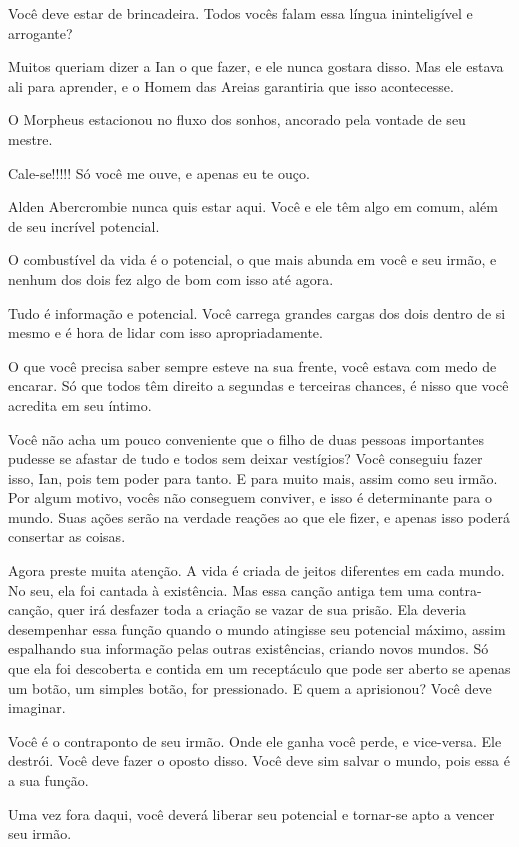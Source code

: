 Você deve estar de brincadeira. Todos vocês falam essa língua
ininteligível e arrogante?

{\large Muitos queriam dizer a Ian o que fazer, e ele nunca gostara
disso. Mas ele estava ali para aprender, e o Homem das Areias garantiria
que isso acontecesse.

O Morpheus estacionou no fluxo dos sonhos, ancorado pela vontade de seu
mestre.}

{\Large Cale-se!!!!! Só você me ouve, e apenas eu te ouço.

Alden Abercrombie nunca quis estar aqui. Você e ele têm algo em comum,
além de seu incrível potencial.

O combustível da vida é o potencial, o que mais abunda em você e seu
irmão, e nenhum dos dois fez algo de bom com isso até agora.

Tudo é informação e potencial. Você carrega grandes cargas dos dois
dentro de si mesmo e é hora de lidar com isso apropriadamente.

O que você precisa saber sempre esteve na sua frente, você estava com
medo de encarar. Só que todos têm direito a segundas e terceiras
chances, é nisso que você acredita em seu íntimo.

Você não acha um pouco conveniente que o filho de duas pessoas
importantes pudesse se afastar de tudo e todos sem deixar vestígios?
Você conseguiu fazer isso, Ian, pois tem poder para tanto. E para muito
mais, assim como seu irmão. Por algum motivo, vocês não conseguem
conviver, e isso é determinante para o mundo. Suas ações serão na
verdade reações ao que ele fizer, e apenas isso poderá consertar as
coisas.

Agora preste muita atenção. A vida é criada de jeitos diferentes em cada
mundo. No seu, ela foi cantada à existência. Mas essa canção antiga tem
uma contra-canção, quer irá desfazer toda a criação se vazar de sua
prisão. Ela deveria desempenhar essa função quando o mundo atingisse seu
potencial máximo, assim espalhando sua informação pelas outras
existências, criando novos mundos. Só que ela foi descoberta e contida
em um receptáculo que pode ser aberto se apenas um botão, um simples
botão, for pressionado. E quem a aprisionou? Você deve imaginar.

Você é o contraponto de seu irmão. Onde ele ganha você perde, e
vice-versa. Ele destrói. Você deve fazer o oposto disso. Você deve sim
salvar o mundo, pois essa é a sua função.

Uma vez fora daqui, você deverá liberar seu potencial e tornar-se apto a
vencer seu irmão.}

